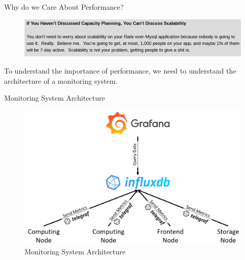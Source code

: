 \documentclass[compress,aspectratio=169]{beamer}
\begin{document}
\begin{frame}{Why do we Care About Performance?}
\begin{center}
\begin{figure}
  \includegraphics[width=\textwidth]{assets/scalefoot.png}
  \caption{\cite{ScaleFoot}}
\end{figure}
To understand the importance of performance, we need to understand the architecture of a monitoring system.
\end{center}
\end{frame}

\begin{frame}{Monitoring System Architecture}
\begin{center}
\begin{figure}
  \includegraphics[height=.8\textheight]{assets/monitoring_system_architecture.png}
  \caption{Monitoring System Architecture}
\end{figure}
\end{center}
\end{frame}
\end{document}

